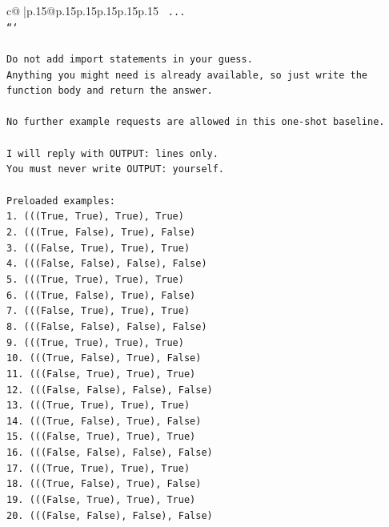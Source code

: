 \documentclass{article}
\begin{document}
{\begin{supertabular}{c@{$\;$}|p{.15\linewidth}@{}p{.15\linewidth}p{.15\linewidth}p{.15\linewidth}p{.15\linewidth}p{.15\linewidth}}
{{{\texttt{    ...} \\
\texttt{```} \\
\\ 
\texttt{Do not add import statements in your guess.} \\
\texttt{Anything you might need is already available, so just write the function body and return the answer.} \\
\\ 
\texttt{No further example requests are allowed in this one{-}shot baseline.} \\
\\ 
\texttt{I will reply with OUTPUT: lines only.} \\
\texttt{You must never write OUTPUT: yourself.} \\
\\ 
\texttt{Preloaded examples:} \\
\texttt{1. (((True, True), True), True)} \\
\texttt{2. (((True, False), True), False)} \\
\texttt{3. (((False, True), True), True)} \\
\texttt{4. (((False, False), False), False)} \\
\texttt{5. (((True, True), True), True)} \\
\texttt{6. (((True, False), True), False)} \\
\texttt{7. (((False, True), True), True)} \\
\texttt{8. (((False, False), False), False)} \\
\texttt{9. (((True, True), True), True)} \\
\texttt{10. (((True, False), True), False)} \\
\texttt{11. (((False, True), True), True)} \\
\texttt{12. (((False, False), False), False)} \\
\texttt{13. (((True, True), True), True)} \\
\texttt{14. (((True, False), True), False)} \\
\texttt{15. (((False, True), True), True)} \\
\texttt{16. (((False, False), False), False)} \\
\texttt{17. (((True, True), True), True)} \\
\texttt{18. (((True, False), True), False)} \\
\texttt{19. (((False, True), True), True)} \\
\texttt{20. (((False, False), False), False)} \\
}}}
\end{supertabular}}
\end{document}
